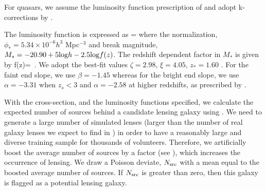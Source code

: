 \documentclass[useAMS,usenatbib,a4paper]{mn2e}
\begin{document}
For quasars, we assume the luminosity function prescription of \citet{Oguri2010}
and adopt k-corrections by \citep{Richards2006}.

The luminosity function is expressed as
\be
{}=
\ee
where the normalization, $\phi_{*}=5.34\times10^{-6} h^3$ Mpc$^{-3}$ and break
magnitude, $M_*=-20.90 + 5 {\rm log} h - 2.5 {\rm log} f(z)$. The redshift
dependent factor in $M_*$ is given by
\be
f(z)= \,.
\ee
We adopt the best-fit values $\zeta=2.98$, $\xi=4.05$, $z_{*}=1.60$
\citep{Oguri2010}. For the faint end slope, we use $\beta=-1.45$ whereas for
the bright end slope, we use $\alpha=-3.31$ when $z_s<3$ and $\alpha=-2.58$ at
higher redshifts, as prescribed by \citet{Oguri2010}.

With the cross-section, and the luminosity functions specified, we
calculate the expected number of sources behind a candidate lensing
galaxy using . We need to generate a large number of
simulated lenses (larger than the number of real galaxy lenses we expect
to find in \cfhtls) in order to have a reasonably large and diverse
training sample for thousands of \sw volunteers. Therefore, we
artificially boost the average number of sources by a factor (see
), which increases the occurrence of lensing. We
draw a Poisson deviate, $N_{\rm src}$ with a mean equal to the boosted
average number of sources. If $N_{\rm src}$ is greater than zero, then
this galaxy is flagged as a potential lensing galaxy.
\end{document}
